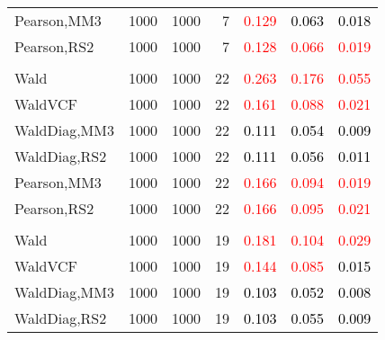 \documentclass[
]{article}
\begin{document}
\begin{table}[H]
{\begin{tabular}[t]{lrrrrrr}
\hspace{1em}Pearson,MM3 & 1000 & 1000 & 7 & \textcolor{red}{0.129} & \textcolor{black}{0.063} & \textcolor{black}{0.018}\\
\hspace{1em}Pearson,RS2 & 1000 & 1000 & 7 & \textcolor{red}{0.128} & \textcolor{red}{0.066} & \textcolor{red}{0.019}\\
\addlinespace[0.3em]
\multicolumn{7}{l}{\textbf{1F 15V}}\\
\hspace{1em}Wald & 1000 & 1000 & 22 & \textcolor{red}{0.263} & \textcolor{red}{0.176} & \textcolor{red}{0.055}\\
\hspace{1em}WaldVCF & 1000 & 1000 & 22 & \textcolor{red}{0.161} & \textcolor{red}{0.088} & \textcolor{red}{0.021}\\
\hspace{1em}WaldDiag,MM3 & 1000 & 1000 & 22 & \textcolor{black}{0.111} & \textcolor{black}{0.054} & \textcolor{black}{0.009}\\
\hspace{1em}WaldDiag,RS2 & 1000 & 1000 & 22 & \textcolor{black}{0.111} & \textcolor{black}{0.056} & \textcolor{black}{0.011}\\
\hspace{1em}Pearson,MM3 & 1000 & 1000 & 22 & \textcolor{red}{0.166} & \textcolor{red}{0.094} & \textcolor{red}{0.019}\\
\hspace{1em}Pearson,RS2 & 1000 & 1000 & 22 & \textcolor{red}{0.166} & \textcolor{red}{0.095} & \textcolor{red}{0.021}\\
\addlinespace[0.3em]
\multicolumn{7}{l}{\textbf{2F 10V}}\\
\hspace{1em}Wald & 1000 & 1000 & 19 & \textcolor{red}{0.181} & \textcolor{red}{0.104} & \textcolor{red}{0.029}\\
\hspace{1em}WaldVCF & 1000 & 1000 & 19 & \textcolor{red}{0.144} & \textcolor{red}{0.085} & \textcolor{black}{0.015}\\
\hspace{1em}WaldDiag,MM3 & 1000 & 1000 & 19 & \textcolor{black}{0.103} & \textcolor{black}{0.052} & \textcolor{black}{0.008}\\
\hspace{1em}WaldDiag,RS2 & 1000 & 1000 & 19 & \textcolor{black}{0.103} & \textcolor{black}{0.055} & \textcolor{black}{0.009}\\

\end{tabular}}
\end{table}
\end{document}
